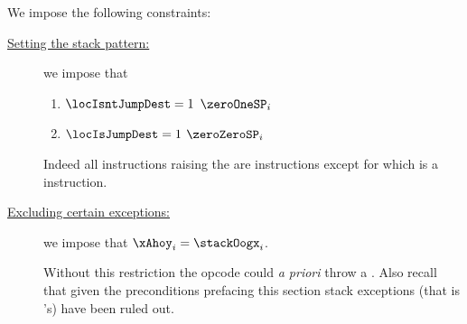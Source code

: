 \begin{center}
\end{center}
We impose the following constraints:
\begin{description}
	\item[\underline{Setting the stack pattern:}]
		we impose that
		\begin{enumerate}
			\item \If $\locIsntJumpDest = 1$ \Then $\zeroOneSP_{i}$
			\item \If $\locIsJumpDest   = 1$ \Then $\zeroZeroSP_{i}$
		\end{enumerate}
		Indeed all instructions raising the \machineStateFlag{} are \zeroOneSP{} instructions except for  which is a \zeroZeroSP{} instruction.
	\item[\underline{Excluding certain exceptions:}]
		we impose that $\xAhoy_{i} = \stackOogx_{i}$.

		\saNote{}
		Without this restriction the  opcode could \emph{a priori} throw a \mxpxSH{}.
		Also recall that given the preconditions prefacing this section stack exceptions (that is \soxSH{}'s) have been ruled out.


\end{description}
